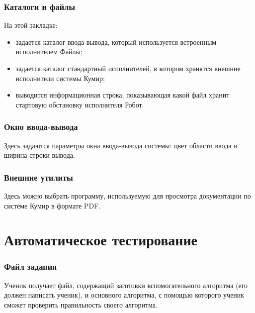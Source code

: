 \subsubsection{Каталоги и файлы}

На этой закладке:
\begin{itemize}
\item задается каталог ввода-вывода, который используется встроенным исполнителем \textsf{\mbox{Файлы}};
\item задается каталог стандартный исполнителей, в котором хранятся внешние исполнители системы Кумир;
\item выводится информационная строка, показывающая какой файл хранит стартовую обстановку исполнителя \textsf{Робот}.
\end{itemize}

\subsubsection{Окно ввода-вывода}

Здесь задаются параметры окна ввода-вывода системы: цвет области ввода и ширина строки вывода.

\subsubsection{Внешние утилиты}

Здесь можно выбрать программу, используемую для просмотра документации по системе Кумир в формате PDF.

\section{Автоматическое тестирование}
\subsubsection{Файл задания}

Ученик получает файл, содержащий заготовки вспомогательного алгоритма (его должен написать ученик), и основного алгоритма, с помощью которого ученик сможет проверить правильность  своего алгоритма.

